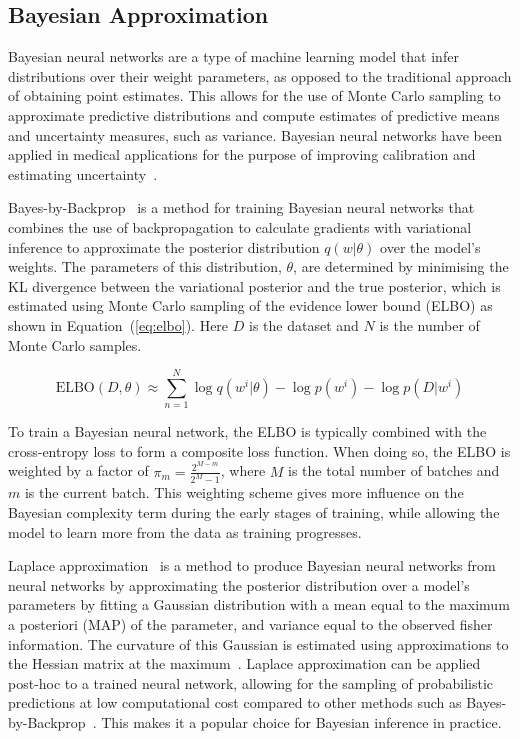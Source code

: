 \subsection{Bayesian Approximation}
\label{subsec:bayesian_calibration}
Bayesian neural networks are a type of machine learning model that infer distributions over their weight parameters, as opposed to the traditional approach of obtaining point estimates. This allows for the use of Monte Carlo sampling to approximate predictive distributions and compute estimates of predictive means and uncertainty measures, such as variance. Bayesian neural networks have been applied in medical applications for the purpose of improving calibration and estimating uncertainty~\citep{kwon2020uncertainty}.

Bayes-by-Backprop~\citep{blundell2015weight} is a method for training Bayesian neural networks that combines the use of backpropagation to calculate gradients with variational inference to approximate the posterior distribution $q(w|\theta)$ over the model's weights. The parameters of this distribution, $\theta$, are determined by minimising the KL divergence between the variational posterior and the true posterior, which is estimated using Monte Carlo sampling of the evidence lower bound (ELBO) as shown in Equation~(\ref{eq:elbo}). Here $D$ is the dataset and $N$ is the number of Monte Carlo samples.

\begin{equation}
	\text{ELBO}(D, \theta) \approx \sum^N_{n=1}\log q(w^i|\theta)-\log p(w^i) - \log p(D|w^i)
	\label{eq:elbo}
\end{equation}

To train a Bayesian neural network, the ELBO is typically combined with the cross-entropy loss to form a composite loss function. When doing so, the ELBO is weighted by a factor of $\pi_m = \frac{2^{M-m}}{2^M-1}$, where $M$ is the total number of batches and $m$ is the current batch. This weighting scheme gives more influence on the Bayesian complexity term during the early stages of training, while allowing the model to learn more from the data as training progresses.

Laplace approximation~\citep{mackay1992bayesian} is a method to produce Bayesian neural networks from neural networks by approximating the posterior distribution over a model’s parameters by fitting a Gaussian distribution with a mean equal to the maximum a posteriori (MAP) of the parameter, and variance equal to the observed fisher information. The curvature of this Gaussian is estimated using approximations to the Hessian matrix at the maximum~\citep{botev2017practical}. Laplace approximation can be applied post-hoc to a trained neural network, allowing for the sampling of probabilistic predictions at low computational cost compared to other methods such as Bayes-by-Backprop~\citep{daxberger2021laplace}. This makes it a popular choice for Bayesian inference in practice.



